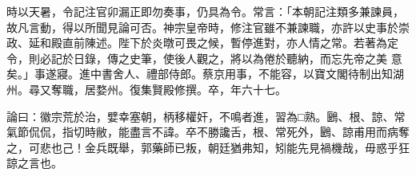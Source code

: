 \begin{pinyinscope}
 時以天暑，令記注官卯漏正即勿奏事，仍具為令。常言：「本朝記注類多兼諫員，故凡言動，得以所聞見論可否。神宗皇帝時，修注官雖不兼諫職，亦許以史事於崇政、延和殿直前陳述。陛下於炎暾可畏之候，暫停進對，亦人情之常。若著為定令，則必記於日錄，傳之史筆，使後人觀之，將以為倦於聽納，而忘先帝之美
 意矣。」事遂寢。進中書舍人、禮部侍郎。蔡京用事，不能容，以寶文閣待制出知湖州。尋又奪職，居婺州。復集賢殿修撰。卒，年六十七。



 論曰：徽宗荒於治，嬖幸塞朝，柄移權奸，不鳴者進，習為□熟。鶠、根、諒、常氣節侃侃，指切時敝，能盡言不諱。卒不勝讒舌，根、常死外，鶠、諒甫用而病奪之，可悲也己！金兵既舉，郭藥師已叛，朝廷猶弗知，矧能先見禍機哉，毋惑乎狂諒之言也。



\end{pinyinscope}